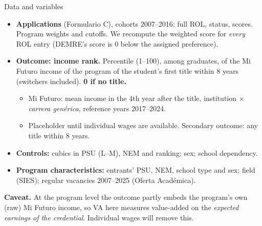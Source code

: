 \documentclass{beamer}
\begin{document}
\begin{frame}{Data and variables}
\small
\begin{itemize}
    \setlength{\itemsep}{4pt}
    \item \textbf{Applications} (Formulario C), cohorts 2007--2016: full ROL, status, scores. Program weights and cutoffs.
    We recompute the weighted score for \emph{every} ROL entry (DEMRE's score is 0 below the assigned preference).
    \item \textbf{Outcome: income rank.} Percentile (1--100), among graduates, of the Mi Futuro income of the program of the student's
    first title within 8 years (switchers included). \textbf{0 if no title.}
    \begin{itemize}
        \item Mi Futuro: mean income in the 4th year after the title, institution $\times$ \emph{carrera gen\'erica}, reference years 2017--2024.
        \item Placeholder until individual wages are available. Secondary outcome: any title within 8 years.
    \end{itemize}
    \item \textbf{Controls:} cubics in PSU (L--M), NEM and ranking; sex; school dependency.
    \item \textbf{Program characteristics:} entrants' PSU, NEM, school type and sex; field (SIES); regular vacancies 2007--2025 (Oferta Acad\'emica).
\end{itemize}

\vspace{0.1cm}
\footnotesize
\textbf{Caveat.} At the program level the outcome partly embeds the program's own (raw) Mi Futuro income, so VA here measures value-added on the
\emph{expected earnings of the credential}. Individual wages will remove this.
\end{frame}
\end{document}
